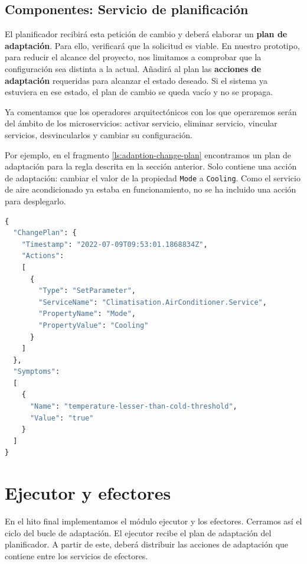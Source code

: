 \subsection{Componentes: Servicio de planificación}

El planificador recibirá esta petición de cambio y deberá elaborar un \textbf{plan de adaptación}. Para ello, verificará que la solicitud es viable. En nuestro prototipo, para reducir el alcance del proyecto, nos limitamos a comprobar que la configuración sea distinta a la actual. Añadirá al plan las \textbf{acciones de adaptación} requeridas para alcanzar el estado deseado. Si el sistema ya estuviera en ese estado, el plan de cambio se queda vacío y no se propaga.

Ya comentamos que los operadores arquitectónicos con los que operaremos serán del ámbito de los microservicios: activar servicio, eliminar servicio, vincular servicios, desvincularlos y cambiar su configuración.

Por ejemplo, en el fragmento \ref{ls:adaption-change-plan} encontramos un plan de adaptación para la regla descrita en la sección anterior. Solo contiene una acción de adaptación: cambiar el valor de la propiedad \texttt{Mode} a \texttt{Cooling}. Como el servicio de aire acondicionado ya estaba en funcionamiento, no se ha incluido una acción para desplegarlo.

\begin{lstlisting}[language=python,caption={Plan de adaptación generado para la regla anterior. Solo contiene una acción de adaptación: cambiar la configuración \texttt{Mode} del servicio \texttt{AirConditioner}.},captionpos=b, label=ls:adaption-change-plan]
{
  "ChangePlan": {
    "Timestamp": "2022-07-09T09:53:01.1868834Z",
    "Actions":
    [
      {
        "Type": "SetParameter",
        "ServiceName": "Climatisation.AirConditioner.Service",
        "PropertyName": "Mode",
        "PropertyValue": "Cooling"
      }
    ]
  },
  "Symptoms":
  [
    {
      "Name": "temperature-lesser-than-cold-threshold",
      "Value": "true"
    }
  ]
}
\end{lstlisting}

\section{Ejecutor y efectores}

En el hito final implementamos el módulo ejecutor y los efectores. Cerramos así el ciclo del bucle de adaptación. El ejecutor recibe el plan de adaptación del planificador. A partir de este, deberá distribuir las acciones de adaptación que contiene entre los servicios de efectores.

